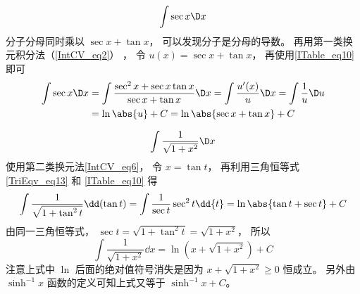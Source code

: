 \begin{exam}{}\label{ITable_ex10}
\begin{equation}
\int \sec x \D x
\end{equation}
分子分母同时乘以 $\sec x + \tan x$， 可以发现分子是分母的导数。 再用第一类换元积分法（\autoref{IntCV_eq2}） ， 令 $u(x) = \sec x + \tan x$， 再使用\autoref{ITable_eq10} 即可
\begin{equation}\begin{aligned}
\int \sec x \D x &= \int \frac{\sec^2 x + \sec x\tan x}{\sec x + \tan x} \D x = \int \frac{u'(x)}{u} \D x = \int \frac 1u \D u \\
&= \ln\abs{u}+C = \ln\abs{\sec x + \tan x}+C
\end{aligned}\end{equation}
\end{exam}


\begin{exam}{}\label{ITable_ex9}
\begin{equation}
\int \frac{1}{\sqrt{1+x^2}} \D x
\end{equation}
使用第二类换元法\autoref{IntCV_eq6}， 令 $x = \tan t$， 再利用三角恒等式\autoref{TriEqv_eq13} 和 \autoref{ITable_eq10} 得
\begin{equation}
\int \frac{1}{\sqrt{1+\tan^2 t}} \dd(\tan t) = \int \frac{1}{\sec t} \sec^2 t\dd{t}
 = \ln\abs{\tan t + \sec t} + C
\end{equation}
由同一三角恒等式， $\sec t = \sqrt{1+\tan^2 t} = \sqrt{1+x^2}$， 所以
\begin{equation}
\int \frac{1}{\sqrt{1+x^2}} \dd{x} = \ln(x + \sqrt{1+x^2}) + C
\end{equation}
注意上式中 $\ln$ 后面的绝对值符号消失是因为 $x + \sqrt{1+x^2}\ge 0 $ 恒成立。 另外由 $\sinh^{-1} x$ 函数的定义可知上式又等于 $\sinh^{-1} x + C$。
\end{exam}